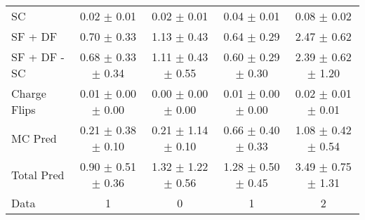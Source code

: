 \begin{tabular}{l|cccc}
                                 SC &  0.02 $\pm$  0.01 &  0.02 $\pm$  0.01 &  0.04 $\pm$  0.01 &  0.08 $\pm$  0.02 \\
                            SF + DF &  0.70 $\pm$  0.33 &  1.13 $\pm$  0.43 &  0.64 $\pm$  0.29 &  2.47 $\pm$  0.62 \\
\hline
                       SF + DF - SC &  0.68 $\pm$  0.33 $\pm$  0.34 &  1.11 $\pm$  0.43 $\pm$  0.55 &  0.60 $\pm$  0.29 $\pm$  0.30 &  2.39 $\pm$  0.62 $\pm$  1.20 \\
\hline\hline
                       Charge Flips &  0.01 $\pm$  0.00 $\pm$  0.00 &  0.00 $\pm$  0.00 $\pm$  0.00 &  0.01 $\pm$  0.00 $\pm$  0.00 &  0.02 $\pm$  0.01 $\pm$  0.01 \\
\hline
                            MC Pred &  0.21 $\pm$  0.38 $\pm$  0.10 &  0.21 $\pm$  1.14 $\pm$  0.10 &  0.66 $\pm$  0.40 $\pm$  0.33 &  1.08 $\pm$  0.42 $\pm$  0.54 \\
\hline
                         Total Pred &  0.90 $\pm$  0.51 $\pm$  0.36 &  1.32 $\pm$  1.22 $\pm$  0.56 &  1.28 $\pm$  0.50 $\pm$  0.45 &  3.49 $\pm$  0.75 $\pm$  1.31 \\
\hline\hline
                               Data &     1 &     0 &     1 &     2 \\
\hline\hline
\end{tabular}

